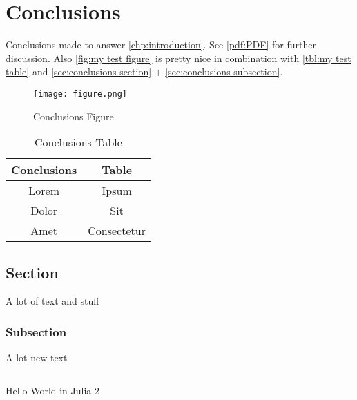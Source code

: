 \chapter{Conclusions}
\label{chp:conclusions}

Conclusions made to answer \autoref{chp:introduction}. See \autoref{pdf:PDF} for further discussion. Also \autoref{fig:my test figure} is pretty nice in combination with \autoref{tbl:my test table} and \autoref{sec:conclusions-section} + \autoref{sec:conclusions-subsection}.

\begin{figure}
    \centering
    \texttt{[image: figure.png]}
    \caption{Conclusions Figure}
    \label{fig:my test figure}
\end{figure}

\begin{table}
    \centering
    \begin{tabular}{|c|c|}
        \hline
        \textbf{Conclusions} & \textbf{Table} \\
        \hline
        Lorem                & Ipsum          \\
        Dolor                & Sit            \\
        Amet                 & Consectetur    \\
        \hline
    \end{tabular}
    \caption{Conclusions Table}
    \label{tbl:my test table}
\end{table}


\section{Section}\label{sec:conclusions-section}
A lot of text and stuff

\subsection{Subsection}\label{sec:conclusions-subsection}
A lot new text

\begin{listing}
    \inputminted{julia}{assets/listings/hello.jl}
    \caption{Hello World in Julia 2}
    \label{lst:julia-2}
\end{listing}